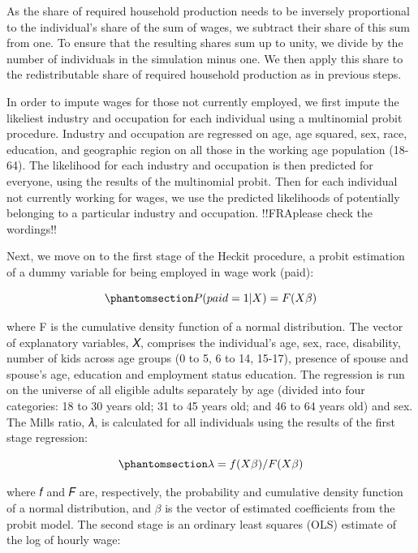 \documentclass[
  11pt,
]{article}
\begin{document}
As the share of required household production needs to be inversely
proportional to the individual's share of the sum of wages, we subtract
their share of this sum from one. To ensure that the resulting shares
sum up to unity, we divide by the number of individuals in the
simulation minus one. We then apply this share to the redistributable
share of required household production as in previous steps.

In order to impute wages for those not currently employed, we first
impute the likeliest industry and occupation for each individual using a
multinomial probit procedure. Industry and occupation are regressed on
age, age squared, sex, race, education, and geographic region on all
those in the working age population (18-64). The likelihood for each
industry and occupation is then predicted for everyone, using the
results of the multinomial probit. Then for each individual not
currently working for wages, we use the predicted likelihoods of
potentially belonging to a particular industry and occupation.
!!FRAplease check the wordings!!

Next, we move on to the first stage of the Heckit procedure, a probit
estimation of a dummy variable for being employed in wage work (paid):

\begin{equation}\phantomsection\label{eq-probit}{P(paid=1|X)=F(X \beta)
}\end{equation}

where F is the cumulative density function of a normal distribution. The
vector of explanatory variables, 𝑋, comprises the individual's age, sex,
race, disability, number of kids across age groups (0 to 5, 6 to 14,
15-17), presence of spouse and spouse's age, education and employment
status education. The regression is run on the universe of all eligible
adults separately by age (divided into four categories: 18 to 30 years
old; 31 to 45 years old; and 46 to 64 years old) and sex. The Mills
ratio, 𝜆, is calculated for all individuals using the results of the
first stage regression:

\begin{equation}\phantomsection\label{eq-mills}{\lambda = f(X\beta)/ F(X\beta)
}\end{equation}

where 𝑓 and 𝐹 are, respectively, the probability and cumulative density
function of a normal distribution, and \(\beta\) is the vector of
estimated coefficients from the probit model. The second stage is an
ordinary least squares (OLS) estimate of the log of hourly wage:
\end{document}

